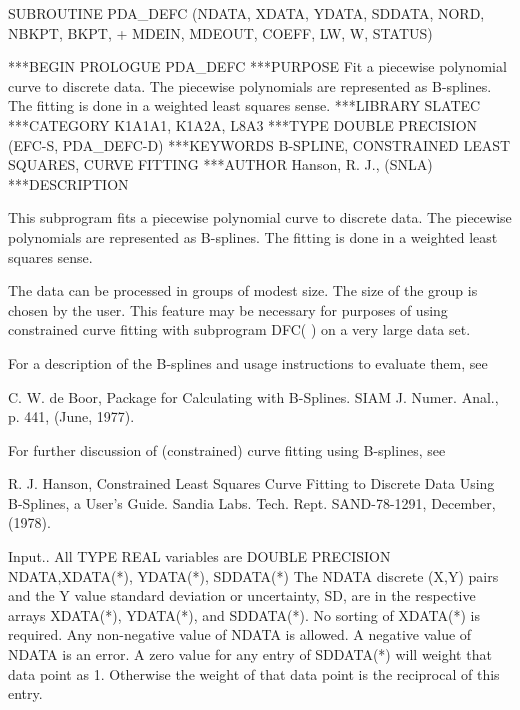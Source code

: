 \documentclass[11pt,twoside,nolof]{starlink}
\begin{document}

\begin{terminalv}
      SUBROUTINE PDA_DEFC (NDATA, XDATA, YDATA, SDDATA, NORD, NBKPT, BKPT,
     +   MDEIN, MDEOUT, COEFF, LW, W, STATUS)


***BEGIN PROLOGUE  PDA_DEFC
***PURPOSE  Fit a piecewise polynomial curve to discrete data.
            The piecewise polynomials are represented as B-splines.
            The fitting is done in a weighted least squares sense.
***LIBRARY   SLATEC
***CATEGORY  K1A1A1, K1A2A, L8A3
***TYPE      DOUBLE PRECISION (EFC-S, PDA_DEFC-D)
***KEYWORDS  B-SPLINE, CONSTRAINED LEAST SQUARES, CURVE FITTING
***AUTHOR  Hanson, R. J., (SNLA)
***DESCRIPTION

      This subprogram fits a piecewise polynomial curve
      to discrete data.  The piecewise polynomials are
      represented as B-splines.
      The fitting is done in a weighted least squares sense.

      The data can be processed in groups of modest size.
      The size of the group is chosen by the user.  This feature
      may be necessary for purposes of using constrained curve fitting
      with subprogram DFC( ) on a very large data set.

      For a description of the B-splines and usage instructions to
      evaluate them, see

      C. W. de Boor, Package for Calculating with B-Splines.
                     SIAM J. Numer. Anal., p. 441, (June, 1977).

      For further discussion of (constrained) curve fitting using
      B-splines, see

      R. J. Hanson, Constrained Least Squares Curve Fitting
                   to Discrete Data Using B-Splines, a User's
                   Guide. Sandia Labs. Tech. Rept. SAND-78-1291,
                   December, (1978).

  Input.. All TYPE REAL variables are DOUBLE PRECISION
      NDATA,XDATA(*),
      YDATA(*),
      SDDATA(*)
                         The NDATA discrete (X,Y) pairs and the Y value
                         standard deviation or uncertainty, SD, are in
                         the respective arrays XDATA(*), YDATA(*), and
                         SDDATA(*).  No sorting of XDATA(*) is
                         required.  Any non-negative value of NDATA is
                         allowed.  A negative value of NDATA is an
                         error.  A zero value for any entry of
                         SDDATA(*) will weight that data point as 1.
                         Otherwise the weight of that data point is
                         the reciprocal of this entry.


\end{terminalv}
\end{document}
